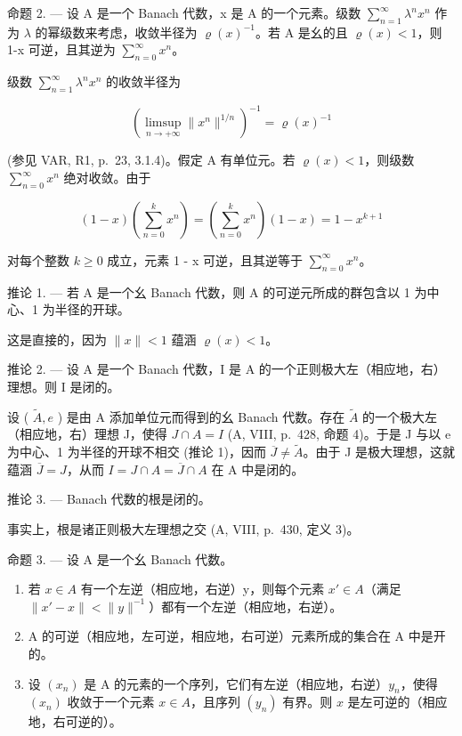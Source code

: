 命题 2. --- 设 A 是一个 Banach 代数，x 是 A 的一个元素。级数 \(\sum_{n=1}^{\infty}\lambda^{n}x^{n}\) 作为 \(\lambda\) 的幂级数来考虑，收敛半径为 \(\varrho(x)^{-1}\)。若 A 是幺的且 \(\varrho(x)<1\)，则 1-x 可逆，且其逆为 \(\sum_{n=0}^{\infty}x^{n}\)。

级数 \(\sum_{n=1}^{\infty}\lambda^{n}x^{n}\) 的收敛半径为

\[
(\limsup _ {n \to + \infty} \| x ^ {n} \| ^ {1 / n}) ^ {- 1} = \varrho (x) ^ {- 1}
\]

(参见 VAR, R1, p.~23, 3.1.4)。假定 A 有单位元。若 \(\varrho(x) < 1\)，则级数 \(\sum_{n=0}^{\infty} x^n\) 绝对收敛。由于

\[
(1 - x) \left(\sum_ {n = 0} ^ {k} x ^ {n}\right) = \left(\sum_ {n = 0} ^ {k} x ^ {n}\right) (1 - x) = 1 - x ^ {k + 1}
\]

对每个整数 \(k \geqslant 0\) 成立，元素 1 - x 可逆，且其逆等于 \(\sum_{n=0}^{\infty} x^{n}\)。

推论 1. --- 若 A 是一个幺 Banach 代数，则 A 的可逆元所成的群包含以 1 为中心、1 为半径的开球。

这是直接的，因为 \(\|x\| < 1\) 蕴涵 \(\varrho(x) < 1\)。

推论 2. --- 设 A 是一个 Banach 代数，I 是 A 的一个正则极大左（相应地，右）理想。则 I 是闭的。

设 ( \(\tilde{A}, e\) ) 是由 A 添加单位元而得到的幺 Banach 代数。存在 \(\tilde{A}\) 的一个极大左（相应地，右）理想 J，使得 \(J \cap A = I\) (A, VIII, p.~428, 命题 4)。于是 J 与以 e 为中心、1 为半径的开球不相交 (推论 1)，因而 \(\overline{J} \neq \widetilde{A}\)。由于 J 是极大理想，这就蕴涵 \(\overline{J} = J\)，从而 \(I = J \cap A = \overline{J} \cap A\) 在 A 中是闭的。

推论 3. --- Banach 代数的根是闭的。

事实上，根是诸正则极大左理想之交 (A, VIII, p.~430, 定义 3)。

命题 3. --- 设 A 是一个幺 Banach 代数。

\begin{enumerate}
\def\labelenumi{\alph{enumi})}
\item
  若 \(x \in A\) 有一个左逆（相应地，右逆）y，则每个元素 \(x' \in A\)（满足 \(\|x' - x\| < \|y\|^{-1}\)）都有一个左逆（相应地，右逆）。
\item
  A 的可逆（相应地，左可逆，相应地，右可逆）元素所成的集合在 A 中是开的。
\item
  设 \((x_{n})\) 是 A 的元素的一个序列，它们有左逆（相应地，右逆）\(y_{n}\)，使得 \((x_{n})\) 收敛于一个元素 \(x \in A\)，且序列 \((y_{n})\) 有界。则 \(x\) 是左可逆的（相应地，右可逆的）。
\end{enumerate}

